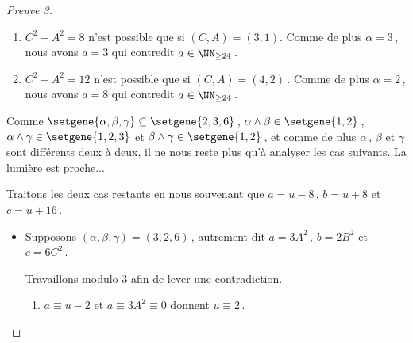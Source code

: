 \begin{proof}[Preuve 3]
\begin{itemize}
\begin{enumerate}
			
			\item $C^2 - A^2 = 8$ n'est possible que si $(C, A) = (3, 1)$.
			Comme de plus $\alpha = 3$\,, nous avons $a = 3$ qui contredit $a \in \NN_{\geq 24}$\,.
			
			
			\item $C^2 - A^2 = 12$ n'est possible que si $(C, A) = (4, 2)$\,.
			Comme de plus $\alpha = 2$\,, nous avons $a = 8$ qui contredit $a \in \NN_{\geq 24}$\,.
		\end{enumerate}
	\end{itemize}


	\medskip
	
	Comme
	$\setgene{\alpha, \beta, \gamma} \subseteq \setgene{2, 3, 6}$\,,
	$\alpha \wedge \beta \in \setgene{1, 2}$\,,
	$\alpha \wedge \gamma \in \setgene{1, 2, 3}$ et
	$\beta \wedge \gamma \in \setgene{1, 2}$\,,
	et comme de plus $\alpha$\,, $\beta$ et $\gamma$ sont différents deux à deux, il ne nous reste plus qu'à analyser les cas suivants.
	La lumière est proche...

	\begin{center}
	\end{center}


	Traitons les deux cas restants en nous souvenant que $a = u - 8$\,, $b = u + 8$ et $c = u + 16$\,.
	
	\begin{itemize}
		\item Supposons $(\alpha, \beta, \gamma) = (3, 2, 6)$\,, 
		autrement dit 
		$a = 3 A^2$\,, $b = 2 B^2$ et $c = 6 C^2$\,.
		
		\smallskip
		\noindent
		Travaillons modulo $3$ afin de lever une contradiction.
		\begin{enumerate}			
			\item $a \equiv u - 2$ et $a \equiv 3 A^2 \equiv 0$ donnent $u \equiv 2$\,.
			

\end{enumerate}
\end{itemize}
\end{proof}
